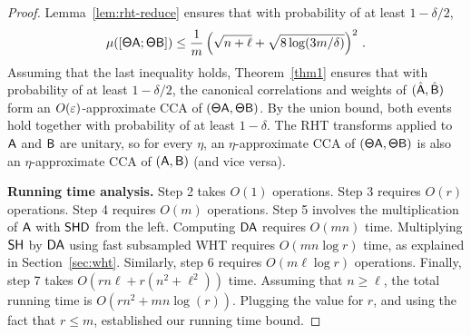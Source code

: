 \begin{proof}
Lemma~\ref{lem:rht-reduce} ensures that with probability of at least $1-\delta/2$,
$$\mu([{\mathsf{\Theta} } {\mathsf{A} }; {\mathsf{\Theta} } {\mathsf{B} }]) \leq \frac{1}{m} \left( \sqrt{n+\ell} + \sqrt{8\log(3m/\delta)} \right)^2\,.$$
Assuming that the last inequality holds, Theorem~\ref{thm1} ensures that with probability of at least $1-\delta/2$,
the canonical correlations and weights of $(\hat{{\mathsf{A} }},  \hat{{\mathsf{B} }})$ form an $O(\varepsilon)$-approximate CCA of
$({\mathsf{\Theta} } {\mathsf{A} }, {\mathsf{\Theta} } {\mathsf{B} })$. By the union bound, both events hold together with probability of at least $1-\delta$.
The RHT transforms applied to ${\mathsf{A} }$ and ${\mathsf{B} }$ are unitary, so for every $\eta$, an $\eta$-approximate CCA of $({\mathsf{\Theta} } {\mathsf{A} }, {\mathsf{\Theta} } {\mathsf{B} })$ is also an $\eta$-approximate CCA of $({\mathsf{A} }, {\mathsf{B} })$ (and vice versa).

{\bf Running time analysis.}
Step 2 takes $O(1)$ operations. Step 3 requires $O(r)$ operations.
Step 4 requires $O(m)$ operations.
Step 5 involves the multiplication of ${\mathsf{A} }$ with ${\mathsf{S} } {\mathsf{H} } {\mathsf{D} }$ from the left.
Computing ${\mathsf{D} } {\mathsf{A} }$ requires $O(mn)$ time. Multiplying ${\mathsf{S} } {\mathsf{H} }$ by ${\mathsf{D} } {\mathsf{A} }$ using fast subsampled WHT requires
$O(m n \log r )$ time, as explained in Section~\ref{sec:wht}.
Similarly, step 6 requires $O( m \ell \log r )$ operations.
Finally, step 7 takes $O( r n \ell + r (n^2 + \ell^2))$ time.  Assuming that $n \geq \ell$, the total running time is
$O(r n^2 + m n \log(r))$. Plugging the value for $r$, and using the fact that $r \leq m$, established our running time bound.



\end{proof}

